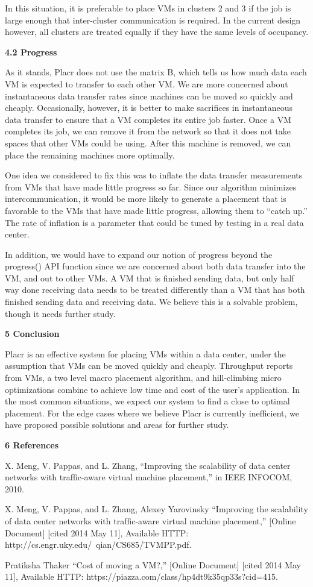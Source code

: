 \documentclass[11pt]{article}
\begin{document}
 In this situation, it is preferable to place VMs in clusters 2 and 3 if the job is large enough that inter-cluster communication is required.  In the current design however, all clusters are treated equally if they have the same levels of occupancy.
 
\Large{\textbf{4.2 Progress}}

\normalsize

As it stands, Placr does not use the matrix B, which tells us how much data each VM is expected to transfer to each other VM. We are more concerned about instantaneous data transfer rates since machines can be moved so quickly and cheaply.  Occasionally, however, it is better to make sacrifices in instantaneous data transfer to ensure that a VM completes its entire job faster.  Once a VM completes its job, we can remove it from the network so that it does not take spaces that other VMs could be using.  After this machine is removed, we can place the remaining machines more optimally.

One idea we considered to fix this was to inflate the data transfer measurements from VMs that have made little progress so far.  Since our algorithm minimizes intercommunication, it would be more likely to generate a placement that is favorable to the VMs that have made little progress, allowing them to “catch up.”  The rate of inflation is a parameter that could be tuned by testing in a real data center.

In addition, we would have to expand our notion of progress beyond the progress() API function since we are concerned about both data transfer into the VM, and out to other VMs.  A VM that is finished sending data, but only half way done receiving data needs to be treated differently than a VM that has both finished sending data and receiving data.  We believe this is a solvable problem, though it needs further study.

\LARGE{\textbf{5 Conclusion}}

\normalsize
Placr is an effective system for placing VMs within a data center, under the assumption that VMs can be moved quickly and cheaply.  Throughput reports from VMs, a two level macro placement algorithm, and hill-climbing micro optimizations combine to achieve low time and cost of the user’s application.  In the most common situations, we expect our system to find a close to optimal placement. For the edge cases where we believe Placr is currently inefficient, we have proposed possible solutions and areas for further study.

\LARGE{\textbf{6 References}}

\normalsize

X. Meng, V. Pappas, and L. Zhang, “Improving the scalability of data
center networks with trafﬁc-aware virtual machine placement,” in IEEE
INFOCOM, 2010.

X. Meng, V. Pappas, and L. Zhang, Alexey Yarovinsky “Improving the scalability of data
center networks with trafﬁc-aware virtual machine placement,” [Online Document] [cited 2014 May 11], Available HTTP: http://cs.engr.uky.edu/~qian/CS685/TVMPP.pdf.

 Pratiksha Thaker “Cost of moving a VM?,” [Online Document] [cited 2014 May 11], Available HTTP: https://piazza.com/class/hp4dt9k35qp33s?cid=415.
\end{document}
